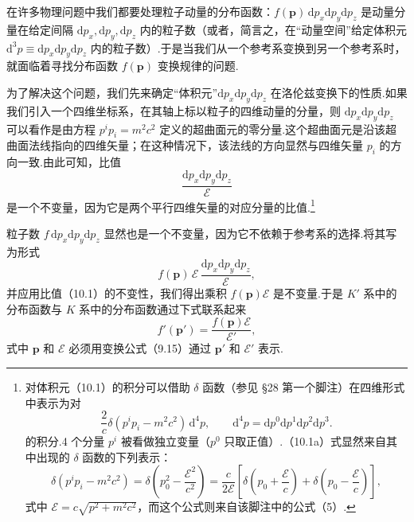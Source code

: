 在许多物理问题中我们都要处理粒子动量的分布函数：$f(\boldsymbol{p})\,\mathrm{d}p_x\mathrm{d}p_y\mathrm{d}p_z$ 是动量分量在给定间隔 $\mathrm{d}p_x,\mathrm{d}p_y,\mathrm{d}p_z$ 内的粒子数（或者，简言之，在“动量空间”给定体积元 $\mathrm{d}^3p\equiv\mathrm{d}p_x\mathrm{d}p_y\mathrm{d}p_z$ 内的粒子数）.于是当我们从一个参考系变换到另一个参考系时，就面临着寻找分布函数 $f(\boldsymbol{p})$ 变换规律的问题.

为了解决这个问题，我们先来确定“体积元”$\mathrm{d}p_x\mathrm{d}p_y\mathrm{d}p_z$ 在洛伦兹变换下的性质.如果我们引入一个四维坐标系，在其轴上标以粒子的四维动量的分量，则 $\mathrm{d}p_x\mathrm{d}p_y\mathrm{d}p_z$ 可以看作是由方程 $p^ip_i=m^2c^2$ 定义的超曲面元的零分量.这个超曲面元是沿该超曲面法线指向的四维矢量；在这种情况下，该法线的方向显然与四维矢量 $p_i$ 的方向一致.由此可知，比值
\begin{equation}
  \frac{\mathrm{d}p_x\mathrm{d}p_y\mathrm{d}p_z}{\mathcal{E}}
\end{equation}
是一个不变量，因为它是两个平行四维矢量的对应分量的比值.\footnote{对体积元（10.1）的积分可以借助 $\delta$ 函数（参见 §28 第一个脚注）在四维形式中表示为对
\begin{equation*}
  \frac{2}{c}\delta(p^ip_i-m^2c^2)\,\mathrm{d}^4p,\qquad
  \mathrm{d}^4p=\mathrm{d}p^0\mathrm{d}p^1\mathrm{d}p^2\mathrm{d}p^3.
  \tag{10.1a}
\end{equation*}
的积分.4 个分量 $p^i$ 被看做独立变量（$p^0$ 只取正值）.（10.1a）式显然来自其中出现的 $\delta$ 函数的下列表示：
\begin{equation*}
  \delta(p^ip_i-m^2c^2)=\delta\left(p_0^2-\frac{\mathcal{E}^2}{c^2}\right)
  =\frac{c}{2\mathcal{E}}\left[\delta\left(p_0+\frac{\mathcal{E}}{c}\right)
  +\delta\left(p_0-\frac{\mathcal{E}}{c}\right)\right],
  \tag{10.1b}
\end{equation*}
式中 $\mathcal{E}=c\sqrt{p^2+m^2c^2}$，而这个公式则来自该脚注中的公式（5）.}

粒子数 $f\,\mathrm{d}p_x\mathrm{d}p_y\mathrm{d}p_z$ 显然也是一个不变量，因为它不依赖于参考系的选择.将其写为形式
\begin{equation*}
  f(\boldsymbol{p})\,\mathcal{E}\,
  \frac{\mathrm{d}p_x\mathrm{d}p_y\mathrm{d}p_z}{\mathcal{E}},
\end{equation*}
并应用比值（10.1）的不变性，我们得出乘积 $f(\boldsymbol{p})\mathcal{E}$ 是不变量.于是 $K'$ 系中的分布函数与 $K$ 系中的分布函数通过下式联系起来
\begin{equation}
  f'(\boldsymbol{p}')=\frac{f(\boldsymbol{p})\mathcal{E}}{\mathcal{E}'},
\end{equation}
式中 $\boldsymbol{p}$ 和 $\mathcal{E}$ 必须用变换公式（9.15）通过 $\boldsymbol{p}'$ 和 $\mathcal{E}'$ 表示.

